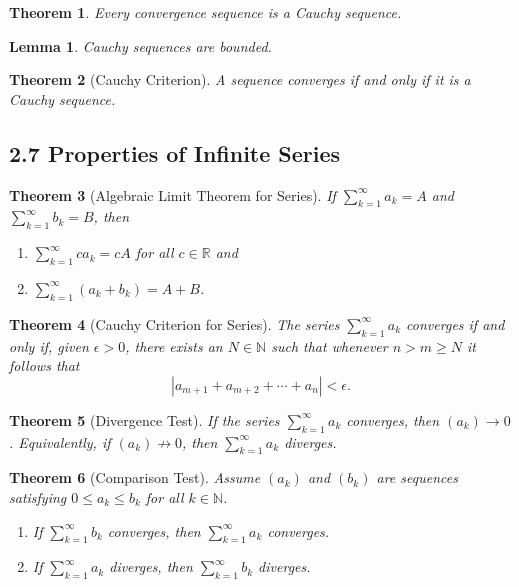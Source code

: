 \documentclass{amsart}
\newtheorem*{theorem}{Theorem}
\newtheorem*{lemma}{Lemma}
\theoremstyle{definition}
\newcommand{\N}{\mathbb{N}}
\newcommand{\R}{\mathbb{R}}
\newcommand{\abs}[1]{|#1|}
\begin{document}
\begin{theorem}
  Every convergence sequence is a Cauchy sequence.
\end{theorem}

\begin{lemma}
  Cauchy sequences are bounded.
\end{lemma}

\begin{theorem}[Cauchy Criterion]
  A sequence converges if and only if it is a Cauchy sequence.
\end{theorem}

\subsection*{2.7 Properties of Infinite Series}

\begin{theorem}[Algebraic Limit Theorem for Series]
  If $\sum_{k=1}^\infty a_k = A$ and $\sum_{k=1}^\infty b_k = B$, then
  \begin{enumerate}[label={(\roman*)}]
    \item $\sum_{k=1}^\infty c a_k = c A$ for all $c \in \R$ and
    \item $\sum_{k=1}^\infty (a_k + b_k) = A + B$.
  \end{enumerate}
\end{theorem}

\begin{theorem}[Cauchy Criterion for Series]
  The series $\sum_{k=1}^\infty a_k$ converges if and only if, given $\epsilon >
  0$, there exists an $N \in \N$ such that whenever $n > m \ge N$ it follows
  that
  \[
    \abs{a_{m+1} + a_{m+2} + \cdots + a_{n}} < \epsilon.
  \]
\end{theorem}

\begin{theorem}[Divergence Test]
  If the series $\sum_{k=1}^\infty a_k$ converges, then $(a_k) \rightarrow 0$.
  Equivalently, if $(a_k) \not\rightarrow 0$, then $\sum_{k=1}^\infty a_k$
  diverges.
\end{theorem}

\begin{theorem}[Comparison Test]
  Assume $(a_k)$ and $(b_k)$ are sequences satisfying $0 \le a_k \le b_k$ for
  all $k \in \N$.
  \begin{enumerate}[label={(\roman*)}]
    \item If $\sum_{k=1}^\infty b_k$ converges, then $\sum_{k=1}^\infty a_k$
      converges.
    \item If $\sum_{k=1}^\infty a_k$ diverges, then $\sum_{k=1}^\infty b_k$
      diverges.
  \end{enumerate}
\end{theorem}
\end{document}
